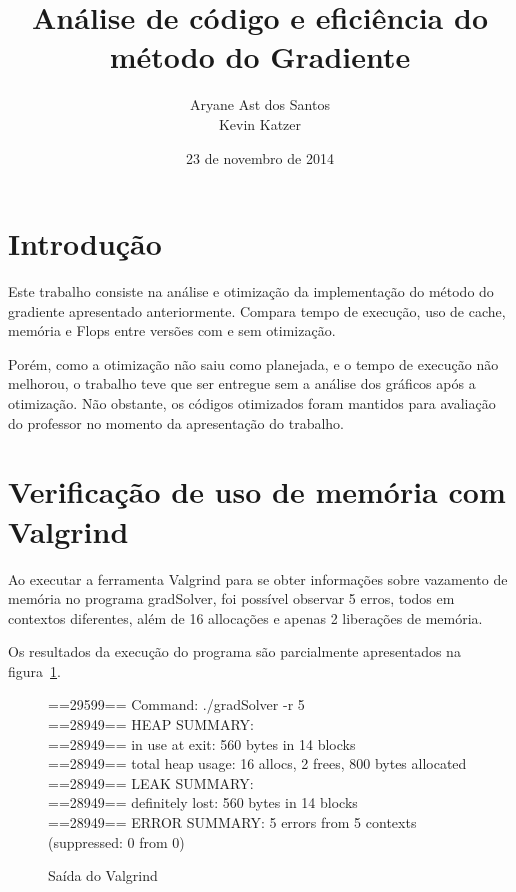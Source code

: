 \documentclass[12pt]{article}
\begin{document}
\setlength{\parskip}{0.2cm}

\title{Análise de código e eficiência do método do Gradiente}

\author{Aryane Ast dos Santos\\ Kevin Katzer}

\date{23 de novembro de 2014}

\maketitle

\tableofcontents

\pagebreak

\section{Introdução}

Este trabalho consiste na análise e otimização da implementação do método do
gradiente apresentado anteriormente. Compara tempo de execução, uso de cache,
memória e Flops entre versões com e sem otimização.

Porém, como a otimização não saiu como planejada, e o tempo de execução 
não melhorou, o trabalho teve que ser entregue sem a análise dos gráficos 
após a otimização. Não obstante, os códigos otimizados foram mantidos para 
avaliação do professor no momento da apresentação do trabalho.

\section{Verificação de uso de memória com Valgrind}\label{sec:Valgrind}

Ao executar a ferramenta Valgrind para se obter informações sobre vazamento de
memória no programa gradSolver, foi possível observar 5 erros, todos em
contextos diferentes, além de 16 allocações e apenas 2 liberações de memória.

Os resultados da execução do programa são parcialmente apresentados na
figura~\ref{fig:valgrindOut}.

\begin{figure}[htb]
\begin{tt}\noindent
==29599== Command: ./gradSolver -r 5\\
==28949== HEAP SUMMARY:\\
==28949==     in use at exit: 560 bytes in 14 blocks\\
==28949==   total heap usage: 16 allocs, 2 frees, 800 bytes allocated\\
==28949== LEAK SUMMARY:\\
==28949==    definitely lost: 560 bytes in 14 blocks\\
==28949== ERROR SUMMARY: 5 errors from 5 contexts (suppressed: 0 from 0)
\end{tt}\caption{Saída do Valgrind}\label{fig:valgrindOut}
\end{figure}
\end{document}
